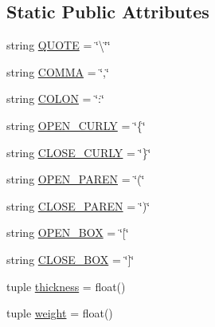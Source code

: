 \subsection*{Static Public Attributes}
\begin{DoxyCompactItemize}
\item 
string \hyperlink{class_bridges_1_1link__visualizer_1_1_link_visualizer_a46d14fbb36b1bc7a49803efe3ece1f23}{Q\+U\+O\+T\+E} = \char`\"{}\textbackslash{}\char`\"{}\char`\"{}
\item 
string \hyperlink{class_bridges_1_1link__visualizer_1_1_link_visualizer_a94ebac44734dfdd10964d2fc3d8f623a}{C\+O\+M\+M\+A} = \char`\"{},\char`\"{}
\item 
string \hyperlink{class_bridges_1_1link__visualizer_1_1_link_visualizer_ae2e8741c1e2d35554350c33e4feab0f4}{C\+O\+L\+O\+N} = \char`\"{}\+:\char`\"{}
\item 
string \hyperlink{class_bridges_1_1link__visualizer_1_1_link_visualizer_a3fccd1dbd36b6e1e6a4280196c0cda33}{O\+P\+E\+N\+\_\+\+C\+U\+R\+L\+Y} = \char`\"{}\{\char`\"{}
\item 
string \hyperlink{class_bridges_1_1link__visualizer_1_1_link_visualizer_a29483e4a583457637b9aa0e215849fee}{C\+L\+O\+S\+E\+\_\+\+C\+U\+R\+L\+Y} = \char`\"{}\}\char`\"{}
\item 
string \hyperlink{class_bridges_1_1link__visualizer_1_1_link_visualizer_ac0955586c3a02eff91be97724bcfbea0}{O\+P\+E\+N\+\_\+\+P\+A\+R\+E\+N} = \char`\"{}(\char`\"{}
\item 
string \hyperlink{class_bridges_1_1link__visualizer_1_1_link_visualizer_a71fd9eda5358b12793bbe9ca74cbc640}{C\+L\+O\+S\+E\+\_\+\+P\+A\+R\+E\+N} = \char`\"{})\char`\"{}
\item 
string \hyperlink{class_bridges_1_1link__visualizer_1_1_link_visualizer_a0b0c770c7e5f05774c376882619396e1}{O\+P\+E\+N\+\_\+\+B\+O\+X} = \char`\"{}\mbox{[}\char`\"{}
\item 
string \hyperlink{class_bridges_1_1link__visualizer_1_1_link_visualizer_a3cb1f0ee010a5173373a38a729164461}{C\+L\+O\+S\+E\+\_\+\+B\+O\+X} = \char`\"{}\mbox{]}\char`\"{}
\item 
tuple \hyperlink{class_bridges_1_1link__visualizer_1_1_link_visualizer_a5d3d3de5ced001b6de1c4e6128e78eb3}{thickness} = float()
\item 
tuple \hyperlink{class_bridges_1_1link__visualizer_1_1_link_visualizer_a95a85a4c31c0af26ece7229bc679032d}{weight} = float()
\end{DoxyCompactItemize}


